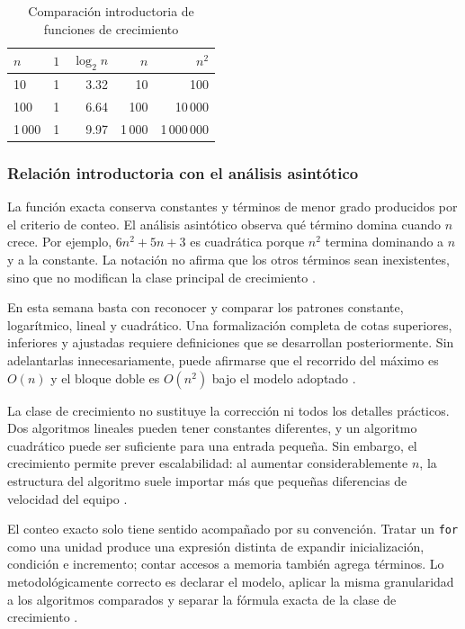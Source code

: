 \documentclass[12pt,letterpaper]{article}
\newcommand{\codigo}[1]{\texttt{#1}}
\begin{document}
\begin{table}[htbp]
\centering
\caption{Comparación introductoria de funciones de crecimiento}
\begin{tabular}{lrrrr}
\toprule
$n$ & $1$ & $\log_2 n$ & $n$ & $n^2$\\
\midrule
10 & 1 & 3.32 & 10 & 100\\
100 & 1 & 6.64 & 100 & 10\,000\\
1\,000 & 1 & 9.97 & 1\,000 & 1\,000\,000\\
\bottomrule
\end{tabular}
\end{table}

\subsubsection{Relación introductoria con el análisis asintótico}

La función exacta conserva constantes y términos de menor grado producidos por el criterio de conteo. El análisis asintótico observa qué término domina cuando $n$ crece. Por ejemplo, $6n^2+5n+3$ es cuadrática porque $n^2$ termina dominando a $n$ y a la constante. La notación no afirma que los otros términos sean inexistentes, sino que no modifican la clase principal de crecimiento \citep{cormen2022,knuth1976,sedgewick2011}.

En esta semana basta con reconocer y comparar los patrones constante, logarítmico, lineal y cuadrático. Una formalización completa de cotas superiores, inferiores y ajustadas requiere definiciones que se desarrollan posteriormente. Sin adelantarlas innecesariamente, puede afirmarse que el recorrido del máximo es $O(n)$ y el bloque doble es $O(n^2)$ bajo el modelo adoptado \citep{zanabria2026,cormen2022,knuth1976}.

La clase de crecimiento no sustituye la corrección ni todos los detalles prácticos. Dos algoritmos lineales pueden tener constantes diferentes, y un algoritmo cuadrático puede ser suficiente para una entrada pequeña. Sin embargo, el crecimiento permite prever escalabilidad: al aumentar considerablemente $n$, la estructura del algoritmo suele importar más que pequeñas diferencias de velocidad del equipo \citep{sedgewick2011,skiena2020,cormen2022}.

El conteo exacto solo tiene sentido acompañado por su convención. Tratar un \codigo{for} como una unidad produce una expresión distinta de expandir inicialización, condición e incremento; contar accesos a memoria también agrega términos. Lo metodológicamente correcto es declarar el modelo, aplicar la misma granularidad a los algoritmos comparados y separar la fórmula exacta de la clase de crecimiento \citep{cook1973,aho1974,cormen2022}.
\end{document}
